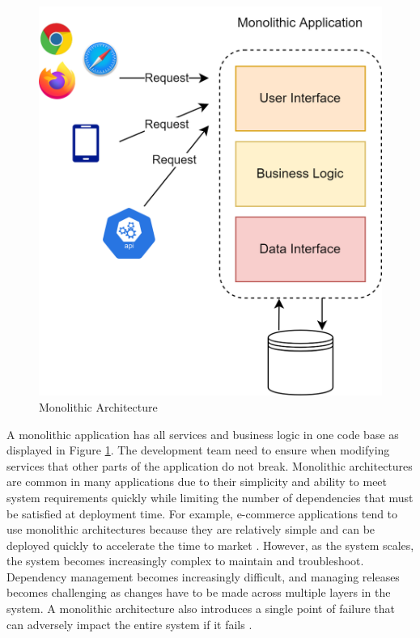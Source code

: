 \documentclass[BIF,Bachelor,nenglish]{twbook}%
\begin{document}
\begin{figure} [H]
 \begin{center}
    \includegraphics[width=0.7\linewidth]{img/Monolith.png}
 \end{center}
 \caption{Monolithic Architecture}
 \label{monolith}
\end{figure}

\noindent
A monolithic application has all services and business logic in one code base as displayed in Figure \ref{monolith}. The development team need to ensure when modifying services that other parts of the application do not break. Monolithic architectures are common in many applications due to their simplicity and ability to meet system requirements quickly while limiting the number of dependencies that must be satisfied at deployment time. For example, e-commerce applications tend to use monolithic architectures because they are relatively simple and can be deployed quickly to accelerate the time to market \cite{frommonotomicro}. However, as the system scales, the system becomes increasingly complex to maintain and troubleshoot. Dependency management becomes increasingly difficult, and managing releases becomes challenging as changes have to be made across multiple layers in the system. A monolithic architecture also introduces a single point of failure that can adversely impact the entire system if it fails \cite{vil2015}.

\end{document}
